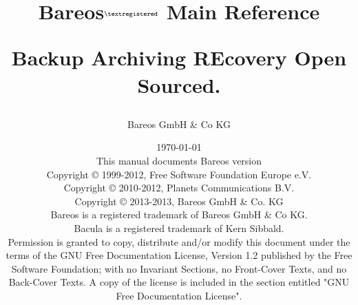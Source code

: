 
\parskip 10pt
\parindent 0pt

\title{%
  \Huge{Bareos}$^{\normalsize \textregistered}$ \Huge{Main Reference}
  \begin{center}
   \large{Backup Archiving REcovery Open Sourced. }
  \end{center}
}


\author{Bareos GmbH \& Co KG}
\date{\vspace{1.0in}\today \\
      This manual documents Bareos version  \\
      \vspace{0.2in}
      Copyright {\copyright} 1999-2012, Free Software Foundation Europe e.V. \\
      Copyright {\copyright} 2010-2012, Planets Communications B.V. \\
      Copyright {\copyright} 2013-2013, Bareos GmbH \& Co. KG \\
      Bareos {\textregistered} is a registered trademark of Bareos GmbH \& Co KG.\\
      Bacula {\textregistered} is a registered trademark of Kern Sibbald.\\
      \vspace{0.2in}
  Permission is granted to copy, distribute and/or modify this document under the terms of the
  GNU Free Documentation License, Version 1.2 published by the Free Software Foundation;
  with no Invariant Sections, no Front-Cover Texts, and no Back-Cover Texts.
  A copy of the license is included in the section entitled "GNU Free Documentation License".
}

\maketitle
